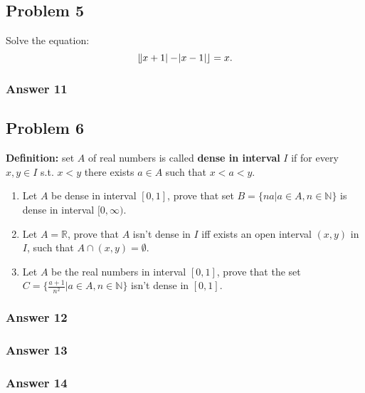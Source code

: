 \documentclass[11pt]{article}
\begin{document}
\subsection{Problem 5}
\label{sec-1-5}
Solve the equation:
\begin{equation*}
   \lfloor \abs{x+1}-\abs{x-1} \rfloor = x.
\end{equation*}


\subsubsection{Answer 11}
\label{sec-1-5-1}
\subsection{Problem 6}
\label{sec-1-6}
\textbf{Definition:} set $A$ of real numbers is called \textbf{dense in interval} $I$ if
for every $x, y \in I$ s.t. $x < y$ there exists $a \in A$ such that
$x < a < y$.

\begin{enumerate}
\item Let $A$ be dense in interval $[0,1]$, prove that set 
      $B=\{na|a \in A, n \in \mathbb{N}\}$ is dense in interval $[0, \infty)$.
\item Let $A=\mathbb{R}$, prove that $A$ isn't dense in $I$ iff exists an
open interval $(x, y)$ in $I$, such that $A \cap (x, y) = \emptyset$.
\item Let $A$ be the real numbers in interval $[0,1]$, prove that the set
      $C=\{\frac{a+1}{n^2} | a \in A, n \in \mathbb{N}\}$ isn't dense in
      $[0,1]$.
\end{enumerate}

\subsubsection{Answer 12}
\label{sec-1-6-1}
\subsubsection{Answer 13}
\label{sec-1-6-2}
\subsubsection{Answer 14}
\label{sec-1-6-3}
\end{document}
